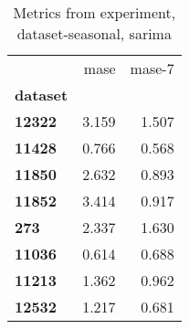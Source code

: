 \begin{table}[h]
\centering
\caption{Metrics from experiment, dataset-seasonal, sarima}
\label{table:sarima-dataset-seasonal}
\begin{tabular}{lrr}
\toprule
{} &   mase &  mase-7 \\
\textbf{dataset} &        &         \\
\midrule
\textbf{12322  } &  3.159 &   1.507 \\
\textbf{11428  } &  0.766 &   0.568 \\
\textbf{11850  } &  2.632 &   0.893 \\
\textbf{11852  } &  3.414 &   0.917 \\
\textbf{273    } &  2.337 &   1.630 \\
\textbf{11036  } &  0.614 &   0.688 \\
\textbf{11213  } &  1.362 &   0.962 \\
\textbf{12532  } &  1.217 &   0.681 \\
\bottomrule
\end{tabular}
\end{table}
